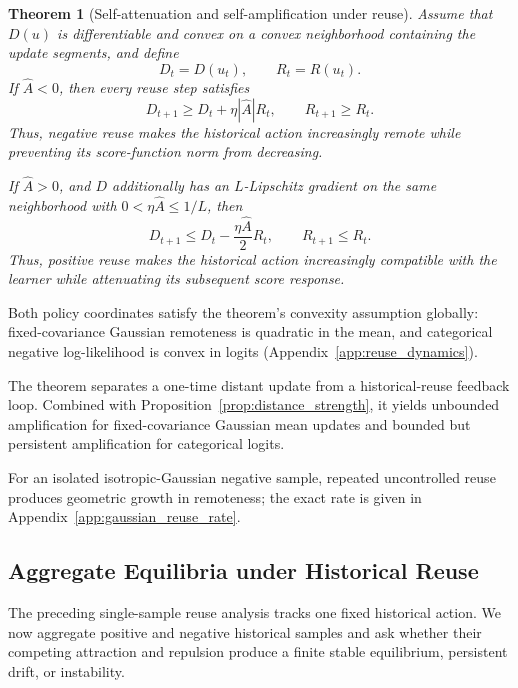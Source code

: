 \documentclass{article}
\theoremstyle{plain}
\newtheorem{theorem}{Theorem}[section]
\theoremstyle{definition}
\theoremstyle{remark}
\begin{document}
\begin{theorem}[Self-attenuation and self-amplification under reuse]
\label{thm:reuse_dynamics}
Assume that \(D(u)\) is differentiable and convex on a convex
neighborhood containing the update segments, and define
\[
    D_t=D(u_t),
    \qquad
    R_t=R(u_t).
\]
If \(\widehat A<0\), then every reuse step satisfies
\begin{equation}
    D_{t+1}
    \ge
    D_t+\eta|\widehat A|R_t,
    \qquad
    R_{t+1}\ge R_t.
    \label{eq:negative_reuse_amplification}
\end{equation}
Thus, negative reuse makes the historical action increasingly remote
while preventing its score-function norm from decreasing.

If \(\widehat A>0\), and \(D\) additionally has an \(L\)-Lipschitz
gradient on the same neighborhood with \(0<\eta\widehat A\le 1/L\), then
\begin{equation}
    D_{t+1}
    \le
    D_t-\frac{\eta\widehat A}{2}R_t,
    \qquad
    R_{t+1}\le R_t.
    \label{eq:positive_reuse_attenuation}
\end{equation}
Thus, positive reuse makes the historical action increasingly compatible
with the learner while attenuating its subsequent score response.
\end{theorem}

Both policy coordinates satisfy the theorem's convexity assumption
globally: fixed-covariance Gaussian remoteness is quadratic in the mean,
and categorical negative log-likelihood is convex in logits
(Appendix~\ref{app:reuse_dynamics}).

The theorem separates a one-time distant update from a historical-reuse
feedback loop. Combined with Proposition~\ref{prop:distance_strength}, it
yields unbounded amplification for fixed-covariance Gaussian mean updates
and bounded but persistent amplification for categorical logits.

For an isolated isotropic-Gaussian negative sample, repeated
uncontrolled reuse produces geometric growth in remoteness; the exact
rate is given in Appendix~\ref{app:gaussian_reuse_rate}.

\subsection{Aggregate Equilibria under Historical Reuse}
\label{sec:aggregate_equilibria}

The preceding single-sample reuse analysis tracks one fixed historical
action. We now aggregate positive and negative historical samples and
ask whether their competing attraction and repulsion produce a finite
stable equilibrium, persistent drift, or instability.
\end{document}
